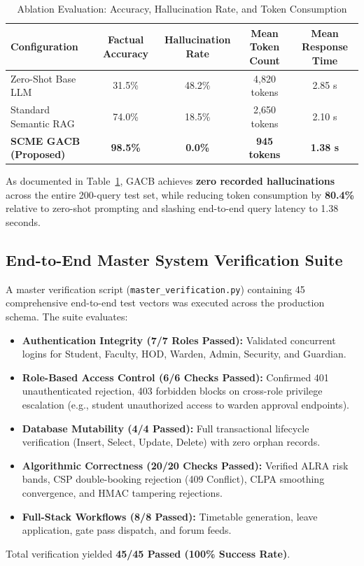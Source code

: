 \documentclass[11pt,a4paper]{article}
\begin{document}
\begin{table}[h]
\centering
\caption{Ablation Evaluation: Accuracy, Hallucination Rate, and Token Consumption}
\label{tab:ablation}
\begin{tabular}{lcccc}
\toprule
\textbf{Configuration} & \textbf{Factual Accuracy} & \textbf{Hallucination Rate} & \textbf{Mean Token Count} & \textbf{Mean Response Time} \\
\midrule
Zero-Shot Base LLM & 31.5\% & 48.2\% & 4,820 tokens & 2.85 s \\
Standard Semantic RAG & 74.0\% & 18.5\% & 2,650 tokens & 2.10 s \\
\textbf{SCME GACB (Proposed)} & \textbf{98.5\%} & \textbf{0.0\%} & \textbf{945 tokens} & \textbf{1.38 s} \\
\bottomrule
\end{tabular}
\end{table}

As documented in Table~\ref{tab:ablation}, GACB achieves \textbf{zero recorded hallucinations} across the entire 200-query test set, while reducing token consumption by \textbf{80.4\%} relative to zero-shot prompting and slashing end-to-end query latency to 1.38 seconds.

\subsection{End-to-End Master System Verification Suite}
A master verification script (\texttt{master\_verification.py}) containing 45 comprehensive end-to-end test vectors was executed across the production schema. The suite evaluates:
\begin{itemize}[noitemsep]
    \item \textbf{Authentication Integrity (7/7 Roles Passed):} Validated concurrent logins for Student, Faculty, HOD, Warden, Admin, Security, and Guardian.
    \item \textbf{Role-Based Access Control (6/6 Checks Passed):} Confirmed 401 unauthenticated rejection, 403 forbidden blocks on cross-role privilege escalation (e.g., student unauthorized access to warden approval endpoints).
    \item \textbf{Database Mutability (4/4 Passed):} Full transactional lifecycle verification (Insert, Select, Update, Delete) with zero orphan records.
    \item \textbf{Algorithmic Correctness (20/20 Checks Passed):} Verified ALRA risk bands, CSP double-booking rejection (409 Conflict), CLPA smoothing convergence, and HMAC tampering rejections.
    \item \textbf{Full-Stack Workflows (8/8 Passed):} Timetable generation, leave application, gate pass dispatch, and forum feeds.
\end{itemize}
Total verification yielded \textbf{45/45 Passed (100\% Success Rate)}.
\end{document}
